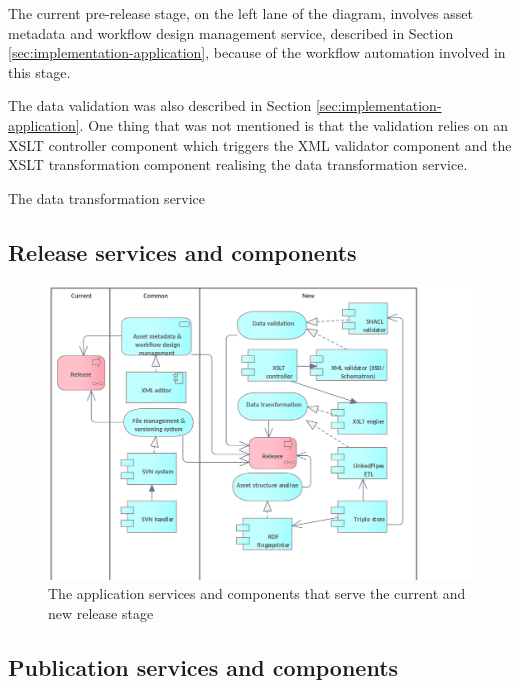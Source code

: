 	The current pre-release stage, on the left lane of the diagram, involves asset metadata and workflow design management service, described in Section \ref{sec:implementation-application}, because of the workflow automation involved in this stage. 
	
	The data validation was also described in Section \ref{sec:implementation-application}. One thing that was not mentioned is that the validation relies on an XSLT \citep{xslt3-Kay} controller component which triggers the XML validator component and the XSLT transformation component realising the data transformation service.
	
	The data transformation service 

	\subsection{Release services and components}
	\label{sec:release-application}	
	
	\begin{figure}[h]
		\centering
		\includegraphics[width=.9\textwidth]{images/application/Release v3.png}
		\caption{The application services and components that serve the current and new release stage}
		\label{fig:application-release}
	\end{figure}
	
	\subsection{Publication services and components}
	\label{sec:publication-application}	
	
